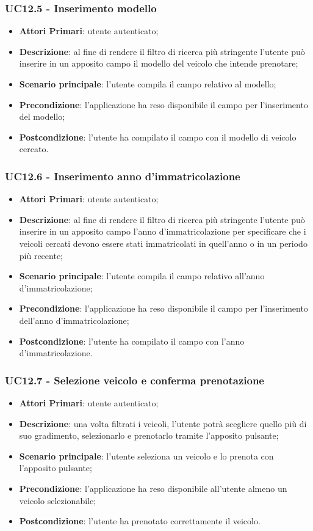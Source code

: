 \subsubsection{UC12.5 - Inserimento modello}
\begin{itemize}
	\item \textbf{Attori Primari}: utente autenticato;
	\item \textbf{Descrizione}: al fine di rendere il filtro di ricerca più stringente l'utente può inserire in un apposito campo il modello del veicolo che intende prenotare;
	\item \textbf{Scenario principale}: l'utente compila il campo relativo al modello;	
	\item \textbf{Precondizione}: l'applicazione ha reso disponibile il campo per l'inserimento del modello;
	\item \textbf{Postcondizione}: l'utente ha compilato il campo con il modello di veicolo cercato.	
\end{itemize}

\subsubsection{UC12.6 - Inserimento anno d'immatricolazione}
\begin{itemize}
	\item \textbf{Attori Primari}: utente autenticato;
	\item \textbf{Descrizione}: al fine di rendere il filtro di ricerca più stringente l'utente può inserire in un apposito campo l'anno d'immatricolazione per specificare che i veicoli cercati devono essere stati immatricolati in quell'anno o in un periodo più recente;
	\item \textbf{Scenario principale}: l'utente compila il campo relativo all'anno d'immatricolazione;	
	\item \textbf{Precondizione}: l'applicazione ha reso disponibile il campo per l'inserimento dell'anno d'immatricolazione;
	\item \textbf{Postcondizione}: l'utente ha compilato il campo con l'anno d'immatricolazione.	
\end{itemize}

\subsubsection{UC12.7 - Selezione veicolo e conferma prenotazione}
\begin{itemize}
	\item \textbf{Attori Primari}: utente autenticato;
	\item \textbf{Descrizione}: una volta filtrati i veicoli, l'utente potrà scegliere quello più di suo gradimento, selezionarlo e prenotarlo tramite l'apposito pulsante;
	\item \textbf{Scenario principale}: 
	l'utente seleziona un veicolo e lo prenota con l'apposito pulsante;
	\item \textbf{Precondizione}: l'applicazione ha reso disponibile all'utente almeno un veicolo selezionabile;
	\item \textbf{Postcondizione}: l'utente ha prenotato correttamente il veicolo.
\end{itemize}

